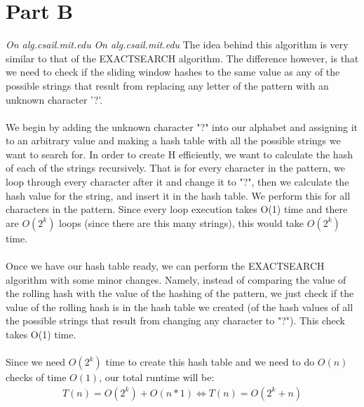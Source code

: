 \documentclass[12pt,twoside]{article}
\begin{document}
\begin{problems}
\begin{problemparts}
\end{problemparts}

\section*{Part B}

\problem
\begin{problemparts}
\problempart \emph{On alg.csail.mit.edu}
\problempart \emph{On alg.csail.mit.edu}
\problempart 
The idea behind this algorithm is very similar to that of the EXACTSEARCH algorithm.
The difference however, is that we need to check if the sliding window hashes to the same value as any of the possible strings that result from replacing any letter of the pattern with an unknown character '?'. 
\\\\
We begin by adding the unknown character "?" into our alphabet and assigning it to an arbitrary value and making a hash table with all the possible strings we want to search for. In order to create H efficiently, we want to calculate the hash of each of the strings recursively. That is for every character in the pattern, we loop through every character after it and change it to "?", then we calculate the hash value for the string, and insert it in the hash table. We perform this for all characters in the pattern. Since every loop execution takes O(1) time and there are $O(2^k)$ loops (since there are this many strings), this would take $O(2^k)$ time. 
\\\\
Once we have our hash table ready, we can perform the EXACTSEARCH algorithm with some minor changes. Namely, instead of comparing the value of the rolling hash with the value of the hashing of the pattern, we just check if the value of the rolling hash is in the hash table we created (of the hash values of all the possible strings that result from changing any character to "?"). This check takes O(1) time.
\\\\
Since we need $O(2^k)$ time to create this hash table and we need to do $O(n)$ checks of time $O(1)$, 
our total runtime will be:
\begin{align*}
T(n)=O(2^k)+O(n*1)\Longleftrightarrow T(n)=O(2^k+n)
\end{align*}

\end{problemparts}

\end{problems}
\end{document}
